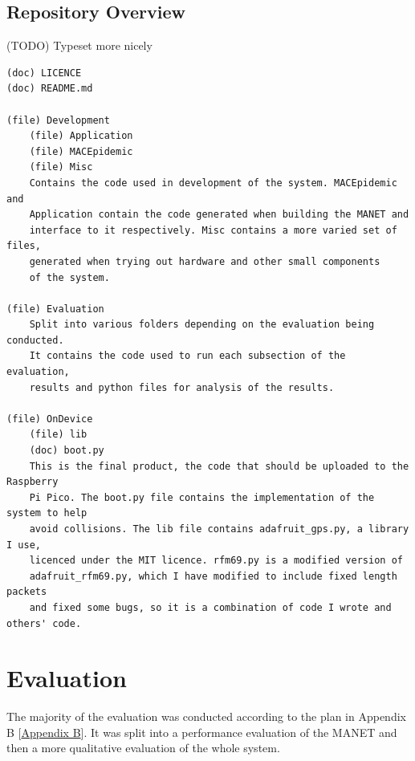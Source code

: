 \documentclass[12pt,a4paper]{report}
\newcommand{\newchapter}[2]{
    \setcounter{chapter}{#1}
    \setcounter{section}{0}
    \chapter*{#2}
    \addcontentsline{toc}{chapter}{#1 #2}
}
\begin{document}
\section{Repository Overview}
(TODO) Typeset more nicely
\begin{verbatim}
(doc) LICENCE
(doc) README.md

(file) Development
    (file) Application
    (file) MACEpidemic
    (file) Misc
    Contains the code used in development of the system. MACEpidemic and 
    Application contain the code generated when building the MANET and 
    interface to it respectively. Misc contains a more varied set of files, 
    generated when trying out hardware and other small components 
    of the system.  

(file) Evaluation
    Split into various folders depending on the evaluation being conducted. 
    It contains the code used to run each subsection of the evaluation, 
    results and python files for analysis of the results. 

(file) OnDevice
    (file) lib
    (doc) boot.py 
    This is the final product, the code that should be uploaded to the Raspberry 
    Pi Pico. The boot.py file contains the implementation of the system to help 
    avoid collisions. The lib file contains adafruit_gps.py, a library I use, 
    licenced under the MIT licence. rfm69.py is a modified version of 
    adafruit_rfm69.py, which I have modified to include fixed length packets 
    and fixed some bugs, so it is a combination of code I wrote and others' code. 
 \end{verbatim}

\newchapter{4}{Evaluation}
\setcounter{figure}{0}
The majority of the evaluation was conducted according to the plan in Appendix B [\hyperref[appendixB]{Appendix B}]. It was split into a performance evaluation of the MANET and then a more qualitative evaluation of the whole system. \\ \\
\end{document}
